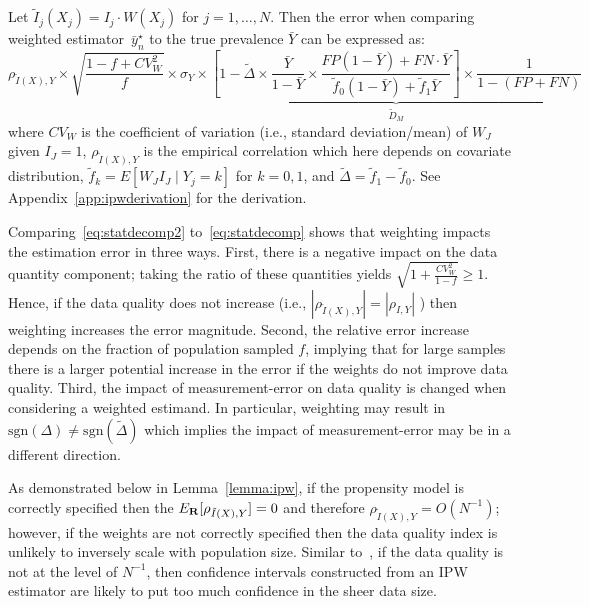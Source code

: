 \documentclass[11pt]{amsart}
\numberwithin{equation}{section}
\theoremstyle{plain}
\begin{document}
 Let $\tilde I_j (X_j) = I_j  \cdot W(X_j)$ for $j=1,\ldots,N$.  Then the error when comparing weighted estimator~$\bar y_n^\star$ to the true prevalence $\bar Y$ can be expressed as:
 \begin{equation}
 \label{eq:statdecomp2}
 \rho_{\tilde I (X), Y} \times \sqrt{\frac{1-f+ CV^2_W}{f}} \times \sigma_{Y} \times \underbrace{\left[ 1 - \tilde \Delta \times \frac{\bar Y}{1-\bar Y} \times \frac{FP(1-\bar Y) + FN \cdot \bar Y}{\tilde f_0 (1-\bar Y) + \tilde f_1 \bar Y} \right] \times \frac{1}{1-(FP+FN)}}_{\tilde D_M}
 \end{equation}
 where $CV_W$ is the coefficient of variation (i.e., standard deviation/mean) of $W_J$ given $I_J = 1$, $\rho_{\tilde I(X), Y}$ is the empirical correlation which here depends on covariate distribution, $\tilde f_k = E[ W_J I_J \mid Y_j = k]$ for $k=0,1$, and $\tilde \Delta = \tilde f_1 - \tilde f_0$.  See Appendix~\ref{app:ipwderivation} for the derivation.

 Comparing~\eqref{eq:statdecomp2} to~\eqref{eq:statdecomp} shows that weighting impacts the estimation error in three ways.  First, there is a negative impact on the data quantity component; taking the ratio of these quantities yields
 $\sqrt{1 + \frac{CV_W^2}{1-f}} \geq 1$.  Hence, if the data quality does not increase (i.e., $| \rho_{\tilde I (X), Y} | = | \rho_{I,Y}|$ ) then weighting increases the error magnitude.  Second, the relative error increase depends on the fraction of population sampled $f$, implying that for large samples there is a larger potential increase in the error if the weights do not improve data quality. Third, the impact of measurement-error on data quality is changed when considering a weighted estimand. In particular, weighting may result in $\text{sgn}(\Delta) \neq \text{sgn} (\tilde \Delta)$ which implies the impact of measurement-error may be in a different direction.

 As demonstrated below in Lemma~\ref{lemma:ipw}, if the propensity model is correctly specified then the $E_{\bf R} [ \rho_{\tilde I (X), Y} ] = 0$ and therefore $\rho_{\tilde I(X), Y} = O(N^{-1})$; however, if the weights are not correctly specified then the data quality index is unlikely to inversely scale with population size.
 Similar to~\cite{Meng2018}, if the data quality is not at the level of $N^{-1}$, then confidence intervals constructed from an IPW estimator are likely to put too much confidence in the sheer data size.
\end{document}
